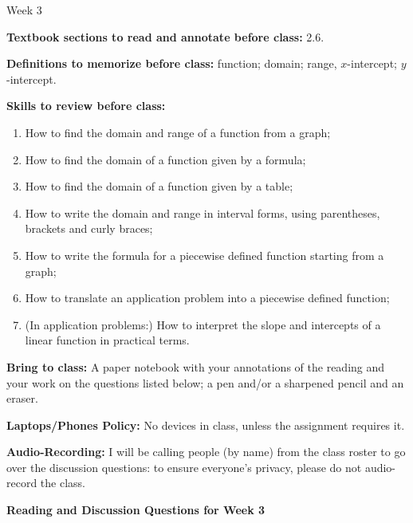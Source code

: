 \documentclass[12pt,dvipsnames]{article}
\begin{document}
\thispagestyle{empty}

	\begin{center}
		{\large{Week 3}}
	\end{center}

{\bfseries{Textbook sections to read and annotate before class:}}  2.6.
\smallskip

	{\bfseries{Definitions to memorize before class:}} function;  domain; range, $x$-intercept; $y$-intercept.
\smallskip	
	
{\bfseries{Skills to review before class:} }
	\begin{enumerate} 

		\item How to find the domain and range of a function from a graph;
		\item How to find the domain of a function given by a formula;
\item How to find the domain of a function given by a table;
		\item How to write the domain and range in interval forms, using parentheses, brackets and curly braces;
		\item How to write the formula for a piecewise defined function starting from a graph;
		\item How to translate an application problem into a piecewise defined function;
		\item (In application problems:) How to interpret the slope and intercepts of a linear function in practical terms.
		
\end{enumerate}
	
		
{\bfseries{Bring to class:} } A paper notebook with your annotations of the reading and your work on the questions listed below; a pen and/or a sharpened pencil and an eraser.

{\bfseries{Laptops/Phones Policy:}}  No devices in class, unless the assignment requires it.

{\bfseries{Audio-Recording:}} I will be calling people (by name) from the class roster to go over the discussion questions: to ensure everyone's privacy, please do not audio-record the class.


\begin{center}

{\large{\bfseries{Reading and Discussion Questions for Week 3} }}
\end{center}
\end{document}
